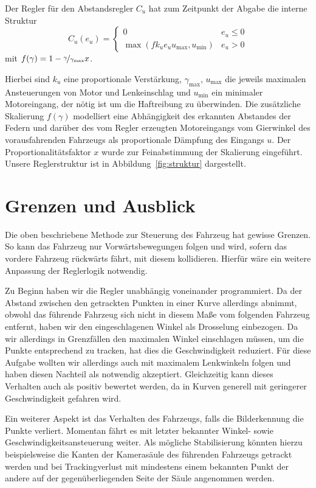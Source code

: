 \documentclass[10pt]{article}
\begin{document}
    Der Regler für den Abstandsregler $C_{u}$ hat zum Zeitpunkt der Abgabe die interne Struktur \[
    C_{u}(e_{u}) = \begin{cases} 0 & e_{u} \leq 0 \\
    \max (fk_{u}e_{u}u_{\max},u_{\min}) &  e_{u} > 0
    \end{cases}
    \]
    mit $f(\gamma) = 1 - \nicefrac{\gamma}{\gamma_{\max}}x$.

    Hierbei sind $k_{u}$ eine proportionale Verstärkung, $\gamma_{\max}$, $u_{\max}$ die jeweils maximalen Ansteuerungen von Motor und Lenkeinschlag und $u_{\min}$ ein minimaler Motoreingang, der nötig ist um die Haftreibung zu überwinden. 
    Die zusätzliche Skalierung $f(\gamma)$ modelliert eine Abhängigkeit des erkannten Abstandes der Federn und darüber des vom Regler erzeugten Motoreingangs vom Gierwinkel des vorausfahrenden Fahrzeugs als proportionale Dämpfung des Eingangs $u$. 
    Der Proportionalitätsfaktor $x$ wurde zur Feinabstimmung der Skalierung eingeführt.
    Unsere Reglerstruktur ist in Abbildung~\ref{fig:struktur} dargestellt.


\section{Grenzen und Ausblick}
    Die oben beschriebene Methode zur Steuerung des Fahrzeug hat gewisse Grenzen.
    So kann das Fahrzeug nur Vorwärtsbewegungen folgen und wird, sofern das vordere Fahrzeug rückwärts fährt, mit diesem kollidieren. Hierfür wäre ein weitere Anpassung der Reglerlogik notwendig.

    Zu Beginn haben wir die Regler unabhängig voneinander programmiert.
    Da der Abstand zwischen den getrackten Punkten in einer Kurve allerdings abnimmt, obwohl das führende Fahrzeug sich nicht in diesem Maße vom folgenden Fahrzeug entfernt, haben wir den eingeschlagenen Winkel als Drosselung einbezogen.
    Da wir allerdings in Grenzfällen den maximalen Winkel einschlagen müssen, um die Punkte entsprechend zu tracken, hat dies die Geschwindigkeit reduziert.
    Für diese Aufgabe wollten wir allerdings auch mit maximalem Lenkwinkeln folgen und haben diesen Nachteil als notwendig akzeptiert. Gleichzeitig kann dieses Verhalten auch als positiv bewertet werden, da in Kurven generell mit geringerer Geschwindigkeit gefahren wird.

    Ein weiterer Aspekt ist das Verhalten des Fahrzeugs, falls die Bilderkennung die Punkte verliert.
    Momentan fährt es mit letzter bekannter Winkel- sowie Geschwindigkeitsansteuerung weiter.
    Als mögliche Stabilisierung könnten hierzu beispielsweise die Kanten der Kamerasäule des führenden Fahrzeugs getrackt werden und bei Trackingverlust mit mindestens einem bekannten Punkt der andere auf der gegenüberliegenden Seite der Säule angenommen werden.
\end{document}
